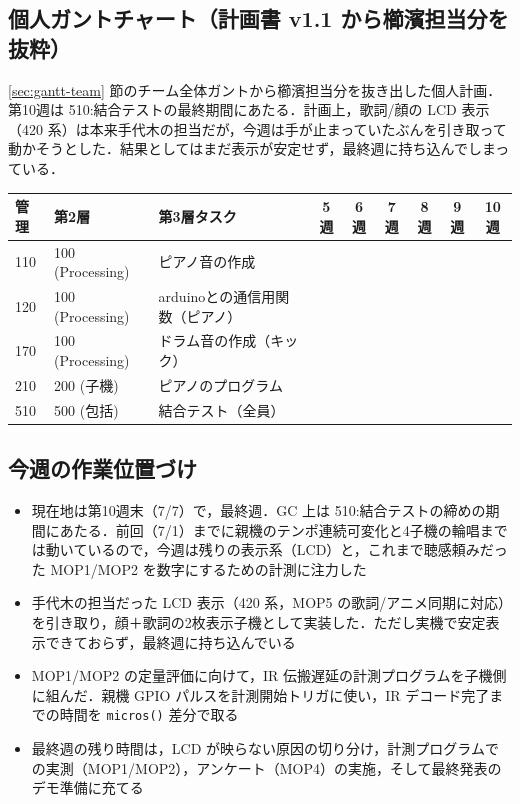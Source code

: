 \documentclass[a4paper,11pt]{ltjsarticle}
\providecommand{\％}{\%}
\begin{document}
\endgroup

\subsection{個人ガントチャート（計画書 v1.1 から櫛濱担当分を抜粋）}\label{sec:gantt-personal}

\ref{sec:gantt-team} 節のチーム全体ガントから櫛濱担当分を抜き出した個人計画．第10週は 510:結合テストの最終期間にあたる．計画上，歌詞/顔の LCD 表示（420 系）は本来手代木の担当だが，今週は手が止まっていたぶんを引き取って動かそうとした．結果としてはまだ表示が安定せず，最終週に持ち込んでしまっている．

\begingroup
\setlength{\tabcolsep}{3pt}
\begin{longtable}{|p{0.9cm}|p{2.0cm}|p{5.2cm}|c|c|c|c|c|c|}
\hline
\rowcolor[gray]{0.9}
管理 & 第2層 & 第3層タスク & 5週 & 6週 & 7週 & 8週 & 9週 & 10週 \\
\hline
110 & 100 (Processing) & ピアノ音の作成 & \cellcolor{ganttCell} & & \cellcolor{ganttCell} & & & \\
\hline
120 & 100 (Processing) & arduinoとの通信用関数（ピアノ） & \cellcolor{ganttCell} & & & & & \\
\hline
170 & 100 (Processing) & ドラム音の作成（キック） & & \cellcolor{ganttCell} & & & & \\
\hline
210 & 200 (子機) & ピアノのプログラム & \cellcolor{ganttCell} & & & & & \\
\hline
510 & 500 (包括) & 結合テスト（全員） & & & & \cellcolor{ganttCell} & \cellcolor{ganttCell} & \cellcolor{ganttCell} \\
\hline
\end{longtable}
\endgroup

\subsection{今週の作業位置づけ}\label{sec:gantt-position}

\begin{itemize}
    \item 現在地は第10週末（7/7）で，最終週．GC 上は 510:結合テストの締めの期間にあたる．前回（7/1）までに親機のテンポ連続可変化と4子機の輪唱までは動いているので，今週は残りの表示系（LCD）と，これまで聴感頼みだった MOP1/MOP2 を数字にするための計測に注力した
    \item 手代木の担当だった LCD 表示（420 系，MOP5 の歌詞/アニメ同期に対応）を引き取り，顔＋歌詞の2枚表示子機として実装した．ただし実機で安定表示できておらず，最終週に持ち込んでいる
    \item MOP1/MOP2 の定量評価に向けて，IR 伝搬遅延の計測プログラムを子機側に組んだ．親機 GPIO パルスを計測開始トリガに使い，IR デコード完了までの時間を \texttt{micros()} 差分で取る
    \item 最終週の残り時間は，LCD が映らない原因の切り分け，計測プログラムでの実測（MOP1/MOP2），アンケート（MOP4）の実施，そして最終発表のデモ準備に充てる
\end{itemize}
\end{document}

